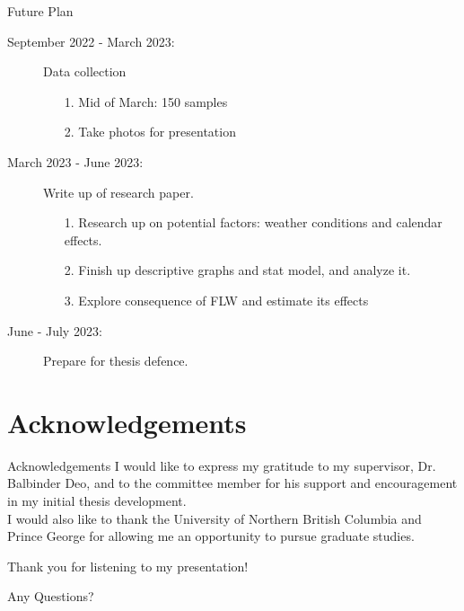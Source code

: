 \documentclass{beamer}
\begin{document}
\begin{frame}{Future Plan}
    \begin{description}
        \item [September 2022 - March 2023:] Data collection
        \begin{enumerate}
            \item[1.] Mid of March: 150 samples
            \item[2.] Take photos for presentation
        \end{enumerate}
        \item [March 2023 - June 2023:] Write up of research paper.
        \begin{enumerate}
            \item[1.] Research up on potential factors: weather conditions and calendar effects.
            \item[2.] Finish up descriptive graphs and stat model, and analyze it.
            \item[3.] Explore consequence of FLW and estimate its effects
        \end{enumerate}
        \item [June - July 2023:] Prepare for thesis defence.
    \end{description}
\end{frame}

\section{Acknowledgements}
\begin{frame}{Acknowledgements}
I would like to express my gratitude to my supervisor, Dr. Balbinder Deo, 
and to the committee member for his support and encouragement in my initial thesis development.\\ 
I would also like to thank the University of Northern British Columbia and Prince George 
for allowing me an opportunity to pursue graduate studies.
\end{frame}

\begin{frame}{}
\Large{Thank you for listening to my presentation!}

\Large{Any Questions?}

\end{frame}
\end{document}
